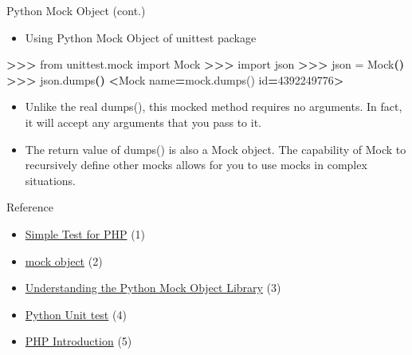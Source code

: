 \documentclass[
  ignorenonframetext,
]{beamer}
\newenvironment{Shaded}{\begin{snugshade}}{\end{snugshade}}
\newcommand{\ErrorTok}[1]{\textcolor[rgb]{0.64,0.00,0.00}{\textbf{#1}}}
\newcommand{\ExtensionTok}[1]{#1}
\newcommand{\KeywordTok}[1]{\textcolor[rgb]{0.13,0.29,0.53}{\textbf{#1}}}
\newcommand{\NormalTok}[1]{#1}
\newcommand{\OperatorTok}[1]{\textcolor[rgb]{0.81,0.36,0.00}{\textbf{#1}}}
\newcommand{\StringTok}[1]{\textcolor[rgb]{0.31,0.60,0.02}{#1}}
\newcommand{\VariableTok}[1]{\textcolor[rgb]{0.00,0.00,0.00}{#1}}
\providecommand{\tightlist}{%
  \setlength{\itemsep}{0pt}\setlength{\parskip}{0pt}}
\begin{document}
\begin{frame}[fragile]{Python Mock Object (cont.)}
\protect\hypertarget{python-mock-object-cont.}{}
\begin{itemize}
\tightlist
\item
  Using Python Mock Object of unittest package
\end{itemize}

\begin{Shaded}
\begin{Highlighting}[]
\OperatorTok{\textgreater{}\textgreater{}\textgreater{}}\NormalTok{ from }\ExtensionTok{unittest.mock}\NormalTok{ import Mock}
\OperatorTok{\textgreater{}\textgreater{}\textgreater{}}\NormalTok{ import }\ExtensionTok{json}
\OperatorTok{\textgreater{}\textgreater{}\textgreater{}}\NormalTok{ json }\ExtensionTok{=}\NormalTok{ Mock}\ErrorTok{(}\KeywordTok{)}
\OperatorTok{\textgreater{}\textgreater{}\textgreater{}}\NormalTok{ json.dumps}\KeywordTok{()}
\OperatorTok{\textless{}}\NormalTok{Mock }\VariableTok{name}\OperatorTok{=}\StringTok{\textquotesingle{}mock.dumps()\textquotesingle{}} \VariableTok{id}\OperatorTok{=}\StringTok{\textquotesingle{}4392249776\textquotesingle{}}\OperatorTok{\textgreater{}}
\end{Highlighting}
\end{Shaded}

\begin{itemize}
\tightlist
\item
  Unlike the real dumps(), this mocked method requires no arguments. In
  fact, it will accept any arguments that you pass to it.
\item
  The return value of dumps() is also a Mock object. The capability of
  Mock to recursively define other mocks allows for you to use mocks in
  complex situations.
\end{itemize}
\end{frame}

\begin{frame}{Reference}
\protect\hypertarget{reference}{}
\begin{itemize}
\tightlist
\item
  \href{http://simpletest.sourceforge.net/en/start-testing.html}{Simple
  Test for PHP} (1)
\item
  \href{https://searchsoftwarequality.techtarget.com/definition/mock-object}{mock
  object} (2)
\item
  \href{https://realpython.com/python-mock-library/}{Understanding the
  Python Mock Object Library} (3)
\item
  \href{https://docs.python.org/3/library/unittest.html}{Python Unit
  test} (4)
\item
  \href{https://www.w3schools.com/PHP/php_intro.asp\#:~:text=What\%20is\%20PHP\%3F\%201\%20PHP\%20is\%20an\%20acronym,4\%20PHP\%20is\%20free\%20to\%20download\%20and\%20use}{PHP
  Introduction} (5)
\end{itemize}
\end{frame}
\end{document}
